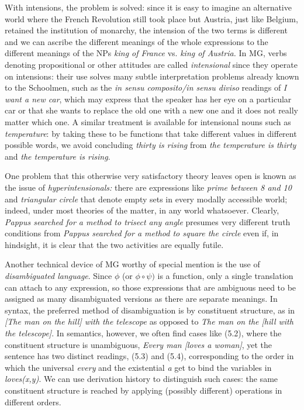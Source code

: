 With intensions, the problem is solved: since it is easy to imagine an
alternative world where the French Revolution still took place but Austria,
just like Belgium, retained the institution of monarchy, the intension of the
two terms is different and we can ascribe the different meanings of the whole
expressions to the different meanings of the NPs {\it king of France} vs. {\it
  king of Austria.}  In MG, verbs denoting propositional or other attitudes
are called {\it intensional} since they operate on intensions: their use
solves many subtle interpretation problems already known to the Schoolmen,
such as the {\it in sensu composito/in sensu diviso} readings of {\it I want a
  new car}, which may express that the speaker has her eye on a particular car
or that she wants to replace the old one with a new one and it does not really
matter which one. A similar treatment is available for intensional nouns such
as {\it temperature}: by taking these to be functions that take different
values in different possible words, we avoid concluding {\it thirty is rising}
from {\it the temperature is thirty} and {\it the temperature is rising}.

One problem that this otherwise very satisfactory theory leaves open is known
as the issue of {\it hyperintensionals:}  there are
expressions like {\it prime between 8 and 10} and {\it triangular circle} that
denote empty sets in every modally accessible world; indeed, under most
theories of the matter, in any world whatsoever. Clearly, {\it Pappus searched
  for a method to trisect any angle} presumes very different truth
conditions from {\it Pappus searched for a method to
square the circle} even if, in hindsight, it is clear that the two activities
are equally futile. 

Another technical device of MG worthy of special mention is the use of {\it
  disambiguated language}. Since $\phi$ (or $\phi \circ
\psi)$ is a function, only a single translation can attach to any expression,
so those expressions that are ambiguous need to be assigned as many
disambiguated versions as there are separate meanings. In syntax, the
preferred method of disambiguation is by constituent structure, as in {\it
  [The man on the hill] with the telescope} as opposed to {\it The man on the
  [hill with the telescope]}. In semantics, however, we often find cases like
(5.2), where the constituent structure is unambiguous, {\it Every man [loves a
    woman]}, yet the sentence has two distinct readings, (5.3) and (5.4),
corresponding to the order in which the universal {\it every} and the
existential {\it a} get to bind the variables in {\it loves(x,y)}. We can use
derivation history to distinguish such cases: the same constituent structure
is reached by applying (possibly different) operations in different orders.


